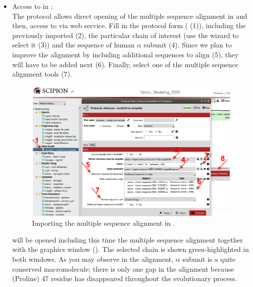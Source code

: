 \begin{itemize}
 \item Access to \modeller in \chimera:\\
 The protocol  allows direct opening of the multiple sequence alignment in \chimera and then, access to \modeller via web service. Fill in the protocol form ( (1)), including the   previously imported (2), the particular chain of interest (use the wizard to select it (3)) and the  sequence of human  $\alpha$ subunit (4). Since we plan to improve the alignment by including additional sequences to align (5), they will have to be added next (6). Finally, select one of the multiple sequence alignment tools (7). 
 
 \begin{figure}[H]
  \centering 
  \captionsetup{width=.9\linewidth} 
  \includegraphics[width=1\textwidth]{Images/Fig13}
  \caption{Importing the multiple sequence alignment in \chimera.}
  \label{fig:model_from_template_protocol}
  \end{figure}
 
 \chimera will be opened including this time the multiple sequence alignment together with the \chimera graphics window (). The  selected chain is shown green-highlighted in both windows. As you may observe in the alignment,  $\alpha$ subunit is a quite conserved macromolecule; there is only one gap in the alignment because  (Proline) 47 residue has disappeared throughout the evolutionary process. 
 

\end{itemize}
